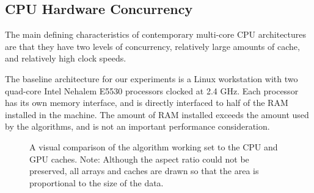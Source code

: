 \documentclass[10pt,twocolumn,letterpaper]{article}
\begin{document}
\subsection{CPU Hardware Concurrency} 
\label{sec:CPU-concurrency}
The main defining characteristics of contemporary multi-core CPU architectures
are that they have two levels of concurrency, relatively large amounts of
cache, and relatively high clock speeds.

The baseline architecture for our experiments is a Linux workstation with two
quad-core Intel Nehalem E5530 processors clocked at 2.4 GHz.  Each processor
has its own memory interface, and is directly interfaced to half of the RAM
installed in the machine.  The amount of RAM installed exceeds the amount used
by the algorithms, and is not an important performance consideration.  

\begin{figure}
\centering
{}
\label{fig:caches}
\caption{A visual comparison of the algorithm working set to the CPU and GPU
caches.  Note: Although the aspect ratio could not be preserved, all arrays and
caches are drawn so that the area is proportional to the size of the data. }
\end{figure}
\end{document}
